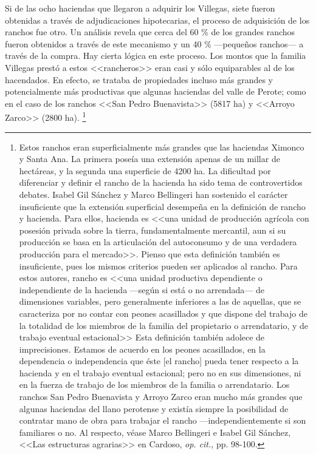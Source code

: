 \documentclass[14pt,twoside,final]{extbook} %
\let\oldfootnote\footnote
\renewcommand\footnote[1]{%
\oldfootnote{\hspace{1mm}#1}}
\begin{document}
Si de las ocho haciendas que llegaron a adquirir los Villegas, siete fueron obtenidas a través de adjudicaciones hipotecarias, el proceso de adquisición de los ranchos fue otro. Un análisis revela que cerca del 60 \% de los grandes ranchos fueron obtenidos a través de este mecanismo y un 40 \% ---pequeños ranchos--- a través de la compra. Hay cierta lógica en este proceso. Los montos que la familia Villegas prestó a estos <<rancheros>> eran casi y sólo equiparables al de los hacendados. En efecto, se trataba de propiedades incluso más grandes y potencialmente más productivas que algunas haciendas del valle de Perote; como en el caso de los ranchos <<San Pedro Buenavista>> (5817 ha) y <<Arroyo Zarco>> (2800 ha).\footnote{Estos ranchos eran superficialmente más grandes que las haciendas Ximonco y Santa Ana. La primera poseía una extensión apenas de un millar de hectáreas, y la segunda una superficie de 4200 ha. La dificultad por diferenciar y definir el rancho de la hacienda ha sido tema de controvertidos debates. Isabel Gil Sánchez y Marco Bellingeri han sostenido el carácter insuficiente que la extensión superficial desempeña en la definición de rancho y hacienda. Para ellos, hacienda es <<una unidad de producción agrícola con posesión privada sobre la tierra, fundamentalmente mercantil, aun si su producción se basa en la articulación del autoconsumo y de una verdadera producción para el mercado>>. Pienso que esta definición también es insuficiente, pues los mismos criterios pueden ser aplicados al rancho. Para estos autores, rancho es <<una unidad productiva dependiente o independiente de la hacienda ---según si está o no arrendada--- de dimensiones variables, pero generalmente inferiores a las de aquellas, que se caracteriza por no contar con peones acasillados y que dispone del trabajo de la totalidad de los miembros de la familia del propietario o arrendatario, y de trabajo eventual estacional>> Esta definición también adolece de imprecisiones. Estamos de acuerdo en los peones acasillados, en la dependencia o independencia que éste [el rancho] pueda tener respecto a la hacienda y en el trabajo eventual estacional; pero no en sus dimensiones, ni en la fuerza de trabajo de los miembros de la familia o arrendatario. Los ranchos San Pedro Buenavista y Arroyo Zarco eran mucho más grandes que algunas haciendas del llano perotense y existía siempre la posibilidad de contratar mano de obra para trabajar el rancho ---independientemente si son familiares o no. Al respecto, véase Marco Bellingeri e Isabel Gil Sánchez, <<Las estructuras agrarias>> en Cardoso, \emph{op. cit.}, pp. 98-100.}
\end{document}
